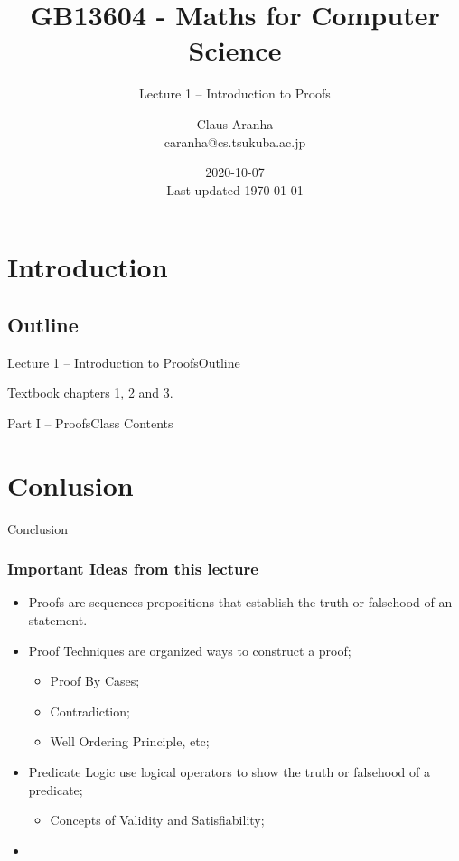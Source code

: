 \documentclass{beamer}
\title[GB13604]{GB13604 - Maths for Computer Science}
\subtitle[]{Lecture 1 -- Introduction to Proofs}
\author[Claus Aranha]{Claus Aranha\\{\footnotesize caranha@cs.tsukuba.ac.jp}}
\institute[COINS]{College of Information Science}
\date[2020-10-07]{2020-10-07\\{\tiny Last updated \today}}
\begin{document}
\section{Introduction}
\subsection{Outline}

\begin{frame}
  \maketitle
\end{frame}

\begin{frame}{Lecture 1 -- Introduction to Proofs}{Outline}

  Textbook chapters 1, 2 and 3.
\end{frame}

\begin{frame}{Part I -- Proofs}{Class Contents}
  \tableofcontents[hideallsubsections, firstsection=2, sections={2-5}]
\end{frame}







\section{Conlusion}

\begin{frame}
  \begin{center}
    Conclusion
  \end{center}
\end{frame}

\begin{frame}
  \frametitle{Important Ideas from this lecture}
  \begin{itemize}
  \item Proofs are sequences propositions that establish the truth or falsehood of an statement.
  \item Proof Techniques are organized ways to construct a proof;
  \begin{itemize}
    \item Proof By Cases;
    \item Contradiction;
    \item Well Ordering Principle, etc;
  \end{itemize}
  \item Predicate Logic use logical operators to show the truth or falsehood of a predicate;
  \begin{itemize}
    \item Concepts of Validity and Satisfiability;
  \end{itemize}
  \item {}
  \end{itemize}
\end{frame}
\end{document}
